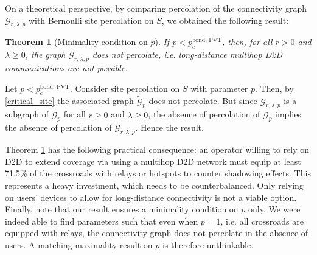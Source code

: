 \documentclass[conference]{IEEEtran}
\newtheorem{theorem}{Theorem}
\begin{document}
\indent On a theoretical perspective, by comparing percolation of the connectivity graph $\mathcal{G}_{r,\lambda,p}$ with Bernoulli site percolation on $S$, we obtained the following result: \\
\begin{theorem}[Minimality condition on $p$] \label{minimality_theorem} If $p<p_{c}^{\text{bond, PVT}}$, then, for all $r > 0$ and $\lambda \geq 0$, the graph $\mathcal{G}_{r,\lambda,p}$ does not percolate, i.e. long-distance multihop D2D communications are not possible.
\end{theorem}
\begin{IEEEproof} 
Let $p < p_{c}^{\text{bond, PVT}}$. Consider site percolation on $S$ with parameter $p$. Then, by \eqref{critical_site} the associated graph $\tilde{\mathcal{G}}_{p}$ does not percolate. But since $\mathcal{G}_{r,\lambda,p}$ is a subgraph of $\tilde{\mathcal{G}}_{p}$ for all $r \geq 0$ and $\lambda \geq 0$, the absence of percolation of $\tilde{\mathcal{G}}_{p}$ implies the absence of percolation of $\mathcal{G}_{r,\lambda,p}$. Hence the result.
\end{IEEEproof}
\vspace{\baselineskip}
\indent Theorem \ref{minimality_theorem} has the following practical consequence: an operator willing to rely on D2D to extend coverage via using a multihop D2D network must equip at least 71.5\% of the crossroads with relays or hotspots to counter shadowing effects. This represents a heavy investment, which needs to be counterbalanced. Only relying on users' devices to allow for long-distance connectivity is not a viable option. Finally, note that our result ensures a minimality condition on $p$ only. We were indeed able to find parameters such that even when $p=1$, i.e. all crossroads are equipped with relays, the connectivity graph does not percolate in the absence of users. A matching maximality result on $p$ is therefore unthinkable. 
\end{document}

